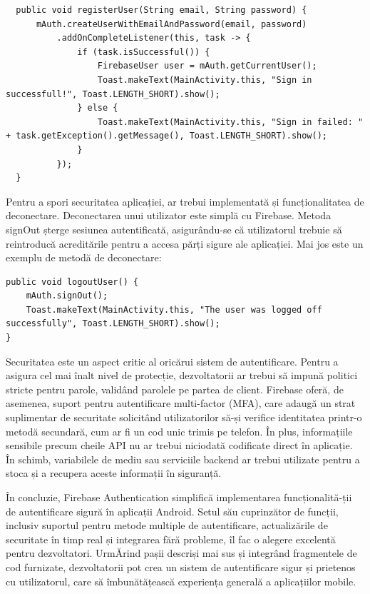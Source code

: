 \documentclass[runningheads]{llncs}
\begin{document}
\begin{lstlisting}
  public void registerUser(String email, String password) {
      mAuth.createUserWithEmailAndPassword(email, password)
          .addOnCompleteListener(this, task -> {
              if (task.isSuccessful()) {
                  FirebaseUser user = mAuth.getCurrentUser();
                  Toast.makeText(MainActivity.this, "Sign in successfull!", Toast.LENGTH_SHORT).show();
              } else {
                  Toast.makeText(MainActivity.this, "Sign in failed: " + task.getException().getMessage(), Toast.LENGTH_SHORT).show();
              }
          });
  }
\end{lstlisting}
Pentru a spori securitatea aplicației, ar trebui implementată și funcționalitatea de deconectare. Deconectarea unui utilizator este simplă cu Firebase. Metoda signOut șterge sesiunea autentificată, asigurându-se că utilizatorul trebuie să reintroducă acreditările pentru a accesa părți sigure ale aplicației. Mai jos este un exemplu de metodă de deconectare:
\begin{lstlisting}
public void logoutUser() {
    mAuth.signOut();
    Toast.makeText(MainActivity.this, "The user was logged off successfully", Toast.LENGTH_SHORT).show();
}
\end{lstlisting}

Securitatea este un aspect critic al oricărui sistem de autentificare. Pentru a asigura cel mai înalt nivel de protecție, dezvoltatorii ar trebui să impună politici stricte pentru parole, validând parolele pe partea de client. Firebase oferă, de asemenea, suport pentru autentificare multi-factor (MFA), care adaugă un strat suplimentar de securitate solicitând utilizatorilor să-și verifice identitatea printr-o metodă secundară, cum ar fi un cod unic trimis pe telefon. În plus, informațiile sensibile precum cheile API nu ar trebui niciodată codificate direct în aplicație. În schimb, variabilele de mediu sau serviciile backend ar trebui utilizate pentru a stoca și a recupera aceste informații în siguranță.

În concluzie, Firebase Authentication simplifică implementarea funcționalită-ții de autentificare sigură în aplicații Android. Setul său cuprinzător de funcții, inclusiv suportul pentru metode multiple de autentificare, actualizările de securitate în timp real și integrarea fără probleme, îl fac o alegere excelentă pentru dezvoltatori. UrmĂrind pașii descriși mai sus și integrând fragmentele de cod furnizate, dezvoltatorii pot crea un sistem de autentificare sigur și prietenos cu utilizatorul, care să îmbunătățească experiența generală a aplicațiilor mobile.
\end{document}
